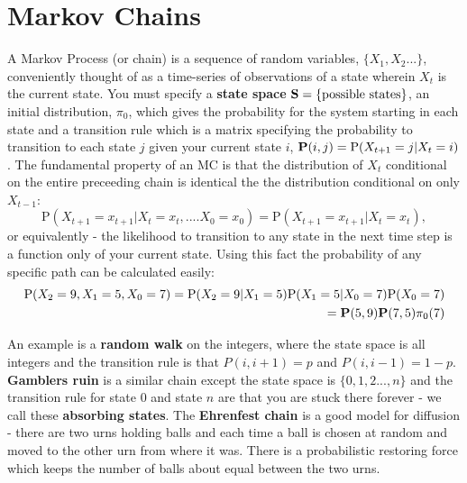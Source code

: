 \section{Markov Chains}
A Markov Process (or chain) is a sequence of random variables, $\{X_1, X_2...\}$, conveniently thought of as a time-series of observations of a state wherein $X_t$ is the current state. You must specify a \textbf{state space} $\bold{S}=\{\textrm{possible states}\}$, an initial distribution, $\pi_0$, which gives the probability for the system starting in each state and a transition rule which is a matrix specifying the probability to transition to each state $j$ given your current state $i$, $\bold{P}(i,j) = \mathrm{P}(X_{t+1} = j | X_t = i)$. The fundamental property of an MC is that the distribution of $X_t$ conditional on the entire preceeding chain is identical the the distribution conditional on only $X_{t-1}$:
\begin{equation}
\mathrm{P}(X_{t+1}=x_{t+1} | X_t = x_t,....X_0 = x_0) = \mathrm{P}(X_{t+1}=x_{t+1} | X_t = x_t),
\end{equation}
or equivalently - the likelihood to transition to any state in the next time step is a function only of your current state. Using this fact the probability of any specific path can be calculated easily:
\begin{align*}
\mathrm{P}(X_2 = 9, X_1 = 5, X_0 = 7) = \mathrm{P}(X_2 = 9| X_1 = 5)\mathrm{P}(X_1=5 | X_0 = 7)\mathrm{P}(X_0 = 7) \\
= \bold{P}(5,9)\bold{P}(7,5)\pi_0(7)
\end{align*}
\n

An example is a \textbf{random walk} on the integers, where the state space is all integers and the transition rule is that $P(i,i+1) = p$ and $P(i,i-1) = 1-p$. \textbf{Gamblers ruin} is a similar chain except the state space is $\{0,1,2...,n\}$ and the transition rule for state 0 and state $n$ are that you are stuck there forever - we call these \textbf{absorbing states}. The \textbf{Ehrenfest chain} is a good model for diffusion - there are two urns holding balls and each time a ball is chosen at random and moved to the other urn from where it was. There is a probabilistic restoring force which keeps the number of balls about equal between the two urns. 
\nn

